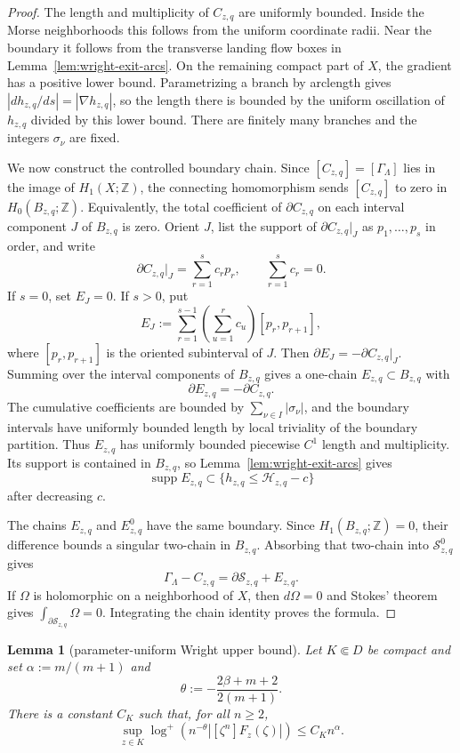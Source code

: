 \documentclass[reqno]{article}
\newtheorem{lem}[theorem]{Lemma}
\theoremstyle{definition}
\theoremstyle{remark}
\theoremstyle{plain}
\begin{document}
\begin{proof}
The length and multiplicity of $C_{z,q}$ are uniformly bounded. Inside the Morse neighborhoods this follows from the uniform coordinate radii. Near the boundary it follows from the transverse landing flow boxes in Lemma~\ref{lem:wright-exit-arcs}. On the remaining compact part of $X$, the gradient has a positive lower bound. Parametrizing a branch by arclength gives $|dh_{z,q}/ds|=|\nabla h_{z,q}|$, so the length there is bounded by the uniform oscillation of $h_{z,q}$ divided by this lower bound. There are finitely many branches and the integers $\sigma_\nu$ are fixed.

We now construct the controlled boundary chain. Since $[C_{z,q}]=[\Gamma_\Lambda]$ lies in the image of $H_1(X;\mathbb Z)$, the connecting homomorphism sends $[C_{z,q}]$ to zero in $H_0(B_{z,q};\mathbb Z)$. Equivalently, the total coefficient of $\partial C_{z,q}$ on each interval component $J$ of $B_{z,q}$ is zero. Orient $J$, list the support of $\partial C_{z,q}|_J$ as $p_1,\dots,p_s$ in order, and write
$$\partial C_{z,q}|_J=\sum_{r=1}^s c_r p_r,\qquad \sum_{r=1}^s c_r=0.$$
If $s=0$, set $E_J=0$. If $s>0$, put
$$E_J:=\sum_{r=1}^{s-1}\left(\sum_{u=1}^r c_u\right)[p_r,p_{r+1}],$$
where $[p_r,p_{r+1}]$ is the oriented subinterval of $J$. Then $\partial E_J=-\partial C_{z,q}|_J$. Summing over the interval components of $B_{z,q}$ gives a one-chain $E_{z,q}\subset B_{z,q}$ with
$$\partial E_{z,q}=-\partial C_{z,q}.$$
The cumulative coefficients are bounded by $\sum_{\nu\in I}|\sigma_\nu|$, and the boundary intervals have uniformly bounded length by local triviality of the boundary partition. Thus $E_{z,q}$ has uniformly bounded piecewise $C^1$ length and multiplicity. Its support is contained in $B_{z,q}$, so Lemma~\ref{lem:wright-exit-arcs} gives
$$\operatorname{supp}E_{z,q}\subset\{h_{z,q}\le\mathcal H_{z,q}-c\}$$
after decreasing $c$.

The chains $E_{z,q}$ and $E^0_{z,q}$ have the same boundary. Since $H_1(B_{z,q};\mathbb Z)=0$, their difference bounds a singular two-chain in $B_{z,q}$. Absorbing that two-chain into $\mathcal S^0_{z,q}$ gives
$$\Gamma_\Lambda-C_{z,q}=\partial\mathcal S_{z,q}+E_{z,q}.$$
If $\Omega$ is holomorphic on a neighborhood of $X$, then $d\Omega=0$ and Stokes' theorem gives $\int_{\partial\mathcal S_{z,q}}\Omega=0$. Integrating the chain identity proves the formula.
\end{proof}

\begin{lem}[parameter-uniform Wright upper bound]\label{lem:wright-upper}
Let $K\Subset D$ be compact and set $\alpha:=m/(m+1)$ and
$$\theta:=-\frac{2\beta+m+2}{2(m+1)}.$$
There is a constant $C_K$ such that, for all $n\ge2$,
\begin{equation}\label{eq:wright-upper}
\sup_{z\in K}\log^+\left(n^{-\theta}\left|[\zeta^n]F_z(\zeta)\right|\right)\le C_K n^\alpha.
\end{equation}
\end{lem}
\end{document}
